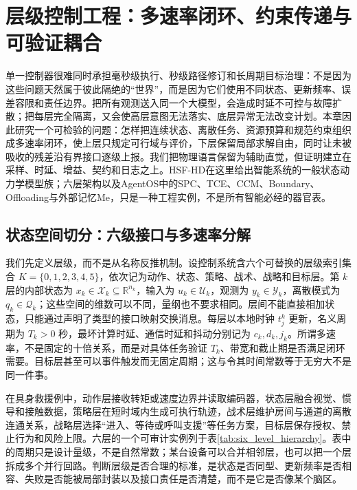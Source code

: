 \chapter{层级控制工程：多速率闭环、约束传递与可验证耦合}
\label{chp:hierarchical_control_engineering}

单一控制器很难同时承担毫秒级执行、秒级路径修订和长周期目标治理：不是因为这些问题天然属于彼此隔绝的“世界”，而是因为它们使用不同状态、更新频率、误差容限和责任边界。把所有观测送入同一个大模型，会造成时延不可控与故障扩散；把每层完全隔离，又会使高层意图无法落实、底层异常无法改变计划。本章因此研究一个可检验的问题：怎样把连续状态、离散任务、资源预算和规范约束组织成多速率闭环，使上层只规定可行域与评价，下层保留局部求解自由，同时让未被吸收的残差沿有界接口逐级上报。我们把物理语言保留为辅助直觉，但证明建立在采样、时延、增益、契约和日志之上。HSF-HD在这里给出智能系统的一般状态动力学模型族；六层架构以及AgentOS中的SPC、TCE、CCM、Boundary、Offloading与外部记忆Me，只是一种工程实例，不是所有智能必经的器官表。

\section{状态空间切分：六级接口与多速率分解}
\label{sec:six_level_topological_mapping}

我们先定义层级，而不是从名称反推机制。设控制系统含六个可替换的层级索引集合 $K=\{0,1,2,3,4,5\}$，依次记为动作、状态、策略、战术、战略和目标层。第 $k$ 层的内部状态为 $x_k\in\mathcal X_k\subseteq\mathbb R^{n_k}$，输入为 $u_k\in\mathcal U_k$，观测为 $y_k\in\mathcal Y_k$，离散模式为 $q_k\in\mathcal Q_k$；这些空间的维数可以不同，量纲也不要求相同。层间不能直接相加状态，只能通过声明了类型的接口映射交换消息。每层以本地时钟 $t^k_j$ 更新，名义周期为 $T_k>0$ 秒，最坏计算时延、通信时延和抖动分别记为 $c_k,d_k,j_k$。所谓多速率，不是固定的十倍关系，而是对具体任务验证 $T_k$、带宽和截止期是否满足闭环需要。目标层甚至可以事件触发而无固定周期；这与令其时间常数等于无穷大不是同一件事。

在具身救援例中，动作层接收转矩或速度边界并读取编码器，状态层融合视觉、惯导和接触数据，策略层在短时域内生成可执行轨迹，战术层维护房间与通道的离散连通关系，战略层选择“进入、等待或呼叫支援”等任务方案，目标层保存授权、禁止行为和风险上限。六层的一个可审计实例列于表\ref{tab:six_level_hierarchy}。表中的周期只是设计量级，不是自然常数；某台设备可以合并相邻层，也可以把一个层拆成多个并行回路。判断层级是否合理的标准，是状态是否同型、更新频率是否相容、失败是否能被局部封装以及接口责任是否清楚，而不是它是否像某个脑区。

